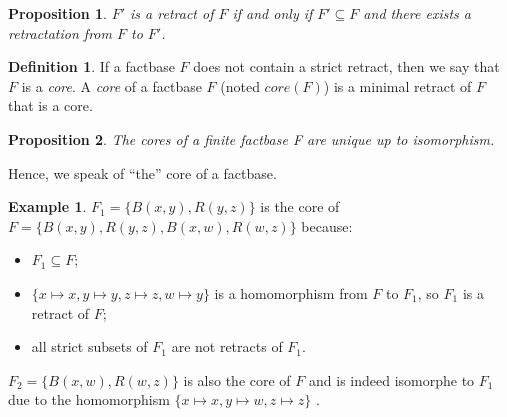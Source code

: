 \documentclass{article}
\newtheorem{proposition}{Proposition}[section]
\theoremstyle{definition}
\newtheorem{definition}{Definition}[section]
\newtheorem{example}{Example}[section]
\theoremstyle{remark}
\begin{document}
\begin{proposition}
$F'$ is a retract of $F$ if and only if $F' \subseteq F$  and there exists a retractation from $F$ to $F'$.
\end{proposition}

\begin{definition}
If a factbase $F$ does not contain a strict retract, then we say that $F$ is a \emph{core}. A \emph{core} of a factbase $F$ (noted \emph{$\textit{core}(F)$}) is a minimal retract of $F$ that is a core.
\end{definition}

\begin{proposition}
The cores of a finite factbase F are unique up to isomorphism.
\end{proposition}

Hence, we speak of ``the'' core of a factbase.

\begin{example}
$F_1 = \{B(x,y),R(y,z)\}$ is the core of $F = \{B(x,y),R(y,z),B(x,w),R(w,z)\}$ because:
\begin{itemize}
\item $F_1 \subseteq F$;
\item $\{x \mapsto x, y \mapsto y, z \mapsto z, w \mapsto y\}$ is a homomorphism from $F$ to $F_1$, so $F_1$ is a retract of $F$;
\item all strict subsets of $F_1$ are not retracts of $F_1$.
\end{itemize}
$F_2 = \{B(x,w),R(w,z)\}$ is also the core of $F$ and is indeed isomorphe to $F_1$ due to the homomorphism $\{x \mapsto x, y \mapsto w, z \mapsto z\}$ .
\end{example}


\end{document}
